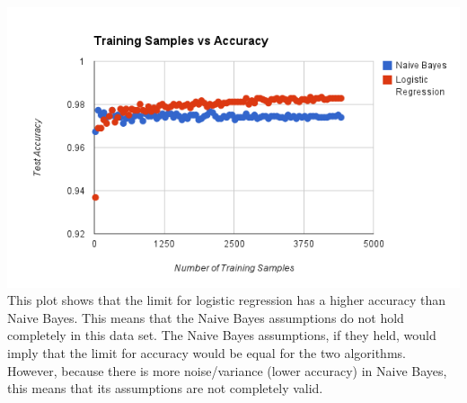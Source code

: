 \documentclass[11pt]{article}
\begin{document}
\includegraphics[scale=0.75]{4c.png}\\
This plot shows that the limit for logistic regression has a higher accuracy than Naive Bayes. This means that the Naive Bayes assumptions do not hold completely in this data set. The Naive Bayes assumptions, if they held, would imply that the limit for accuracy would be equal for the two algorithms. However, because there is more noise/variance (lower accuracy) in Naive Bayes, this means that its assumptions are not completely valid.
\end{document}

